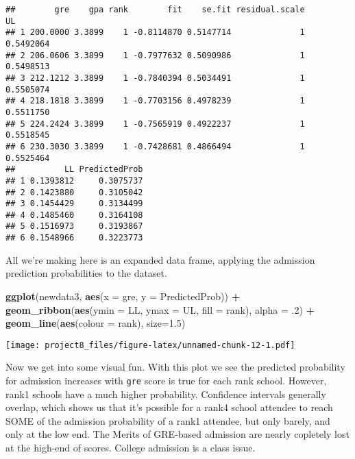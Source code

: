 \documentclass[]{article}
\newenvironment{Shaded}{\begin{snugshade}}{\end{snugshade}}
\newcommand{\KeywordTok}[1]{\textcolor[rgb]{0.13,0.29,0.53}{\textbf{#1}}}
\newcommand{\DataTypeTok}[1]{\textcolor[rgb]{0.13,0.29,0.53}{#1}}
\newcommand{\DecValTok}[1]{\textcolor[rgb]{0.00,0.00,0.81}{#1}}
\newcommand{\FloatTok}[1]{\textcolor[rgb]{0.00,0.00,0.81}{#1}}
\newcommand{\StringTok}[1]{\textcolor[rgb]{0.31,0.60,0.02}{#1}}
\newcommand{\OperatorTok}[1]{\textcolor[rgb]{0.81,0.36,0.00}{\textbf{#1}}}
\newcommand{\NormalTok}[1]{#1}
\begin{document}
\begin{verbatim}
##        gre    gpa rank        fit    se.fit residual.scale        UL
## 1 200.0000 3.3899    1 -0.8114870 0.5147714              1 0.5492064
## 2 206.0606 3.3899    1 -0.7977632 0.5090986              1 0.5498513
## 3 212.1212 3.3899    1 -0.7840394 0.5034491              1 0.5505074
## 4 218.1818 3.3899    1 -0.7703156 0.4978239              1 0.5511750
## 5 224.2424 3.3899    1 -0.7565919 0.4922237              1 0.5518545
## 6 230.3030 3.3899    1 -0.7428681 0.4866494              1 0.5525464
##          LL PredictedProb
## 1 0.1393812     0.3075737
## 2 0.1423880     0.3105042
## 3 0.1454429     0.3134499
## 4 0.1485460     0.3164108
## 5 0.1516973     0.3193867
## 6 0.1548966     0.3223773
\end{verbatim}

All we're making here is an expanded data frame, applying the admission
prediction probabilities to the dataset.

\begin{Shaded}
\begin{Highlighting}[]
\KeywordTok{ggplot}\NormalTok{(newdata3, }\KeywordTok{aes}\NormalTok{(}\DataTypeTok{x =}\NormalTok{ gre, }\DataTypeTok{y =}\NormalTok{ PredictedProb)) }\OperatorTok{+}\StringTok{ }
\StringTok{  }\KeywordTok{geom_ribbon}\NormalTok{(}\KeywordTok{aes}\NormalTok{(}\DataTypeTok{ymin =}\NormalTok{ LL, }\DataTypeTok{ymax =}\NormalTok{ UL, }\DataTypeTok{fill =}\NormalTok{ rank), }\DataTypeTok{alpha =}\NormalTok{ .}\DecValTok{2}\NormalTok{) }\OperatorTok{+}\StringTok{ }
\StringTok{  }\KeywordTok{geom_line}\NormalTok{(}\KeywordTok{aes}\NormalTok{(}\DataTypeTok{colour =}\NormalTok{ rank), }\DataTypeTok{size=}\FloatTok{1.5}\NormalTok{)}
\end{Highlighting}
\end{Shaded}

\texttt{[image: project8\_files/figure-latex/unnamed-chunk-12-1.pdf]}

Now we get into some visual fun. With this plot we see the predicted
probability for admission increases with \texttt{gre} score is true for
each rank school. However, rank1 schools have a much higher probability.
Confidence intervals generally overlap, which shows us that it's
possible for a rank4 school attendee to reach SOME of the admission
probability of a rank1 attendee, but only barely, and only at the low
end. The Merits of GRE-based admission are nearly copletely lost at the
high-end of scores. College admission is a class issue.
\end{document}
